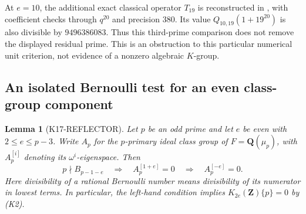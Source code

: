\documentclass[11pt,a4paper]{article}
\newtheorem{lemma}[theorem]{Lemma}
\theoremstyle{definition}
\begin{document}
At $e=10$, the additional exact classical operator $T_{19}$ is
reconstructed in
, with coefficient
checks through $q^{20}$ and precision $380$.
Its value $Q_{10,19}(1+19^{20})$ is also divisible by $9496386083$.
Thus this third-prime comparison does not remove the displayed residual
prime. This is an obstruction to this particular numerical unit
criterion, not evidence of a nonzero algebraic $K$-group.

\subsection{An isolated Bernoulli test for an even class-group component}
\label{sec:isolated-reflection}

\begin{lemma}[K17-REFLECTOR]\label{lem:isolated-reflection}
Let $p$ be an odd prime and let $e$ be even with $2\le e\le p-3$.
Write $A_p$ for the $p$-primary ideal class group of
$F=\mathbf Q(\mu_p)$, with $A_p^{[i]}$ denoting its
$\omega^i$-eigenspace. Then
\[
 p\nmid B_{p-1-e}
 \quad\Longrightarrow\quad A_p^{[1+e]}=0
 \quad\Longrightarrow\quad A_p^{[-e]}=0.
 \tag{RB.1}
\]
Here divisibility of a rational Bernoulli number means divisibility of
its numerator in lowest terms. In particular, the left-hand condition
implies $K_{2e}(\mathbf Z)\{p\}=0$ by (K2).
\end{lemma}
\end{document}
